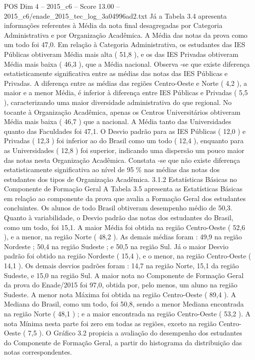 \begin{textsample}{POS Dim 4 – 2015\_c6 – Score 13.00 – 2015\_c6/enade\_2015\_tec\_log\_3a04996ad2.txt}
Já a Tabela 3.4 apresenta informações referentes à Média da nota final desagregadas por Categoria Administrativa e por Organização Acadêmica.
A Média das notas da prova como um todo foi 47,0.
Em relação à Categoria Administrativa, os estudantes das IES Públicas obtiveram Média mais alta ( 51,8 ), e os das IES Privadas obtiveram Média mais baixa ( 46,3 ), que a Média nacional.
Observa -se que existe diferença estatisticamente significativa entre as médias das notas das IES Públicas e Privadas.
A diferença entre as médias das regiões Centro-Oeste e Norte ( 4,2 ), a maior e a menor Média, é inferior à diferença entre IES Públicas e Privadas ( 5,5 ), caracterizando uma maior diversidade administrativa do que regional.
No tocante à Organização Acadêmica, apenas os Centros Universitários obtiveram Média mais baixa ( 46,7 ) que a nacional.
A Média tanto das Universidades quanto das Faculdades foi 47,1.
O Desvio padrão para as IES Públicas ( 12,0 ) e Privadas ( 12,3 ) foi inferior ao do Brasil como um todo ( 12,4 ), enquanto para as Universidades ( 12,8 ) foi superior, indicando uma dispersão um pouco maior das notas nesta Organização Acadêmica.
Constata -se que não existe diferença estatisticamente significativa ao nível de 95 \% nas médias das notas dos estudantes dos tipos de Organização Acadêmica. 3.1.2 Estatísticas Básicas no Componente de Formação Geral A Tabela 3.5 apresenta as Estatísticas Básicas em relação ao componente da prova que avalia a Formação Geral dos estudantes concluintes.
Os alunos de todo Brasil obtiveram desempenho médio de 50,3.
Quanto à variabilidade, o Desvio padrão das notas dos estudantes do Brasil, como um todo, foi 15,1.
A maior Média foi obtida na região Centro-Oeste ( 52,6 ), e a menor, na região Norte ( 48,2 ).
As demais médias foram : 49,9 na região Nordeste ; 50,4 na região Sudeste ; e 50,5 na região Sul.
Já o maior Desvio padrão foi obtido na região Nordeste ( 15,4 ), e o menor, na região Centro-Oeste ( 14,1 ).
Os demais desvios padrões foram : 14,7 na região Norte, 15,1 da região Sudeste, e 15,0 na região Sul.
A maior nota no Componente de Formação Geral da prova do Enade/2015 foi 97,0, obtida por, pelo menos, um aluno na região Sudeste.
A menor nota Máxima foi obtida na região Centro-Oeste ( 89,4 ).
A Mediana do Brasil, como um todo, foi 50,8, sendo a menor Mediana encontrada na região Norte ( 48,1 ) ; e a maior encontrada na região Centro-Oeste ( 53,2 ).
A nota Mínima nesta parte foi zero em todas as regiões, exceto na região Centro-Oeste ( 7,5 ).
O Gráfico 3.2 propicia a avaliação do desempenho dos estudantes do Componente de Formação Geral, a partir do histograma da distribuição das notas correspondentes.

\end{textsample}
